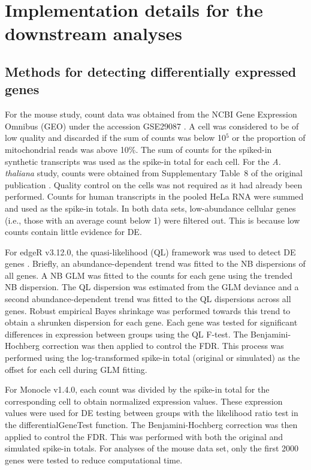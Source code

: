 \documentclass{article}
\begin{document}
\section{Implementation details for the downstream analyses}

\subsection{Methods for detecting differentially expressed genes}
For the mouse study, count data was obtained from the NCBI Gene Expression Omnibus (GEO) under the accession GSE29087 \cite{islam2011characterization}.
A cell was considered to be of low quality and discarded if the sum of counts was below 10$^5$ or the proportion of mitochondrial reads was above 10\%.
The sum of counts for the spiked-in synthetic transcripts was used as the spike-in total for each cell.
For the \textit{A. thaliana} study, counts were obtained from Supplementary Table~8 of the original publication \cite{brennecke2013accounting}.
Quality control on the cells was not required as it had already been performed.
Counts for human transcripts in the pooled HeLa RNA were summed and used as the spike-in totals.
In both data sets, low-abundance cellular genes (i.e., those with an average count below 1) were filtered out.
This is because low counts contain little evidence for DE. 

For edgeR v3.12.0, the quasi-likelihood (QL) framework was used to detect DE genes \cite{lund2012detecting}.
Briefly, an abundance-dependent trend was fitted to the NB dispersions of all genes.
A NB GLM was fitted to the counts for each gene using the trended NB dispersion.
The QL dispersion was estimated from the GLM deviance and a second abundance-dependent trend was fitted to the QL dispersions across all genes.
Robust empirical Bayes shrinkage was performed towards this trend to obtain a shrunken dispersion for each gene.
Each gene was tested for significant differences in expression between groups using the QL F-test.
The Benjamini-Hochberg correction was then applied to control the FDR.
This process was performed using the log-transformed spike-in total (original or simulated) as the offset for each cell during GLM fitting.

For Monocle v1.4.0, each count was divided by the spike-in total for the corresponding cell to obtain normalized expression values.
These expression values were used for DE testing between groups with the likelihood ratio test in the differentialGeneTest function.
The Benjamini-Hochberg correction was then applied to control the FDR.
This was performed with both the original and simulated spike-in totals.
For analyses of the mouse data set, only the first 2000 genes were tested to reduce computational time.
\end{document}
